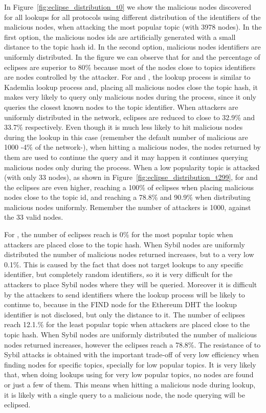 In Figure~\ref{fig:eclipse_distribution_t0} we show the malicious nodes discovered for all lookups for all protocols using different distribution of the identifiers of the malicious nodes,  when attacking the most popular topic (with 3978 nodes).  In the first option, the malicious nodes ids are artificially generated with a small distance to the topic hash id.  In the second option, malicious nodes identifiers are uniformly distributed.  In the figure we can observe that for \altname and \altnameticket the percentage of eclipses are superior to 80\% because most of the nodes close to topics identifiers are nodes controlled by the attacker.  
For \altname and \altnameticket, the lookup process is similar to Kademlia lookup process and,  placing all malicious nodes close the topic hash,  it makes very likely to query only malicious nodes during the process, since it only queries the closest known nodes to the topic identifier.
When attackers are uniformly distributed in the network, eclipses are reduced to close to 32.9\% and 33.7\% respectively.
Even though it is much less likely to hit malicious nodes during the lookup in this case (remember the default number of malicious are 1000 -4\% of the network-),  when hitting a malicious nodes, the nodes returned by them are used to continue the  query and it may happen it continues querying malicious nodes only during the process.
When a low popularity topic is attacked (with only 33 nodes),  as shown in Figure~\ref{fig:eclipse_distribution_t299},  for  \altname and \altnameticket the eclipses are even higher, reaching a 100\% of eclipses when placing malicious nodes close to the topic id, and reaching a 78.8\% and 90.9\% when distributing malicious nodes uniformly.  
Remember the number of attackers is 1000,  against the 33 valid nodes.

For \discv,  the number of eclipses reach is 0\% for the most popular topic when attackers are placed close to the topic hash.  When Sybil nodes are uniformly distributed the number of malicious nodes returned increases,  but to a very low 0.1\%.
This is caused by the fact that \discv does not target lookups to any specific identifier,  but completely random identifiers,  so it is very difficult for the attackers to place Sybil nodes where they will be queried.  Moreover it is difficult by the attackers to send identifiers where the lookup process will be likely to continue to,  because in the FIND node for the Ethereum DHT the lookup identifier is not disclosed,  but only the distance to it.
The number of eclipses reach 12.1.\% for the least popular topic when attackers are placed close to the topic hash.  When Sybil nodes are uniformly distributed the number of malicious nodes returned increases,  however the eclipses  reach a 78.8\%.
The resistance of \discv to Sybil attacks is obtained with the important trade-off of very low efficiency when finding nodes for specific topics, specially for low popular topics.  It is very likely that, when doing lookups using \discv for very low popular topics, no nodes are found or just a few of them.   This means when hitting a malicious node during lookup,  it is likely with a single query to a malicious node, the node querying will be eclipsed.

